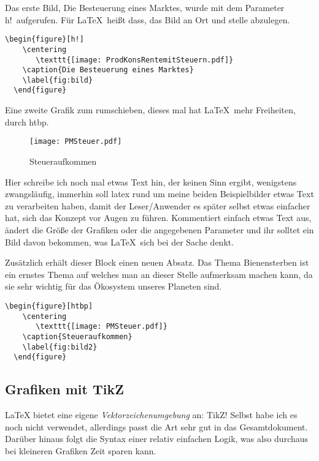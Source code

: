 Das erste Bild, \glqq Die Besteuerung eines Marktes\grqq, wurde mit dem Parameter \glqq h!\grqq\ aufgerufen. Für \LaTeX{}\ heißt dass, das Bild an Ort und stelle abzulegen.%

\begin{lstlisting}[float=htpb,caption=Einbindung einer Grafik so nah wie möglich am Text,label=lst:float_h]
  \begin{figure}[h!]
    \centering
       \texttt{[image: ProdKonsRentemitSteuern.pdf]}
    \caption{Die Besteuerung eines Marktes}
    \label{fig:bild}
  \end{figure}
\end{lstlisting}

Eine zweite Grafik zum rumschieben, dieses mal hat \LaTeX{}\ mehr Freiheiten, durch \glqq htbp\grqq.

\begin{figure}[htbp]
  \centering
     \texttt{[image: PMSteuer.pdf]}
  \caption{Steueraufkommen}
  \label{fig:bild2}
\end{figure}

Hier schreibe ich noch mal etwas Text hin, der keinen Sinn ergibt, wenigstens zwangsläufig, immerhin soll \gls{latex} rund um meine beiden Beispielbilder etwas Text zu verarbeiten haben, damit der Leser/Anwender es später selbst etwas einfacher hat, sich das Konzept vor Augen zu führen. Kommentiert einfach etwas Text aus, ändert die Größe der Grafiken oder die angegebenen Parameter und ihr solltet ein Bild davon bekommen, was \LaTeX{}\ sich bei der Sache denkt.

Zusätzlich erhält dieser Block einen neuen Absatz. Das Thema Bienensterben ist ein ernstes Thema auf welches man an dieser Stelle aufmerksam machen kann, da sie sehr wichtig für das Ökosystem unseres Planeten sind.

\begin{lstlisting}[float=htpb,caption=Automatische Einbindung einer Grafik,label=lst:float_htbp]
  \begin{figure}[htbp]
    \centering
       \texttt{[image: PMSteuer.pdf]}
    \caption{Steueraufkommen}
    \label{fig:bild2}
  \end{figure}
\end{lstlisting}
\subsection{Grafiken mit TikZ}%
\label{sec:tikzgraph}
\LaTeX{} bietet eine eigene \emph{Vektorzeichenumgebung} an: \glqq TikZ\grqq! Selbst habe ich es noch nicht verwendet, allerdings passt die Art sehr gut in das Gesamtdokument. Darüber hinaus folgt die Syntax einer relativ einfachen Logik, was also durchaus bei kleineren Grafiken Zeit sparen kann.

